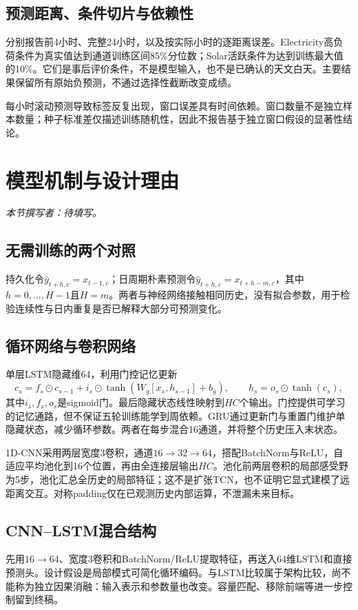 \documentclass[10pt,a4paper]{article}
\begin{document}
\subsection{预测距离、条件切片与依赖性}
分别报告前4小时、完整24小时，以及按实际小时的逐距离误差。Electricity高负荷条件为真实值达到通道训练区间85\%分位数；Solar活跃条件为达到训练最大值的10\%。它们是事后评价条件，不是模型输入，也不是已确认的天文白天。主要结果保留所有原始负预测，不通过选择性截断改变成绩。

每小时滚动预测导致标签反复出现，窗口误差具有时间依赖。窗口数量不是独立样本数量；种子标准差仅描述训练随机性，因此不报告基于独立窗口假设的显著性结论。

\clearpage
\section{模型机制与设计理由}
\noindent\textit{本节撰写者：待填写。}


\subsection{无需训练的两个对照}
持久化令$\hat y_{t+h,c}=x_{t-1,c}$；日周期朴素预测令$\hat y_{t+h,c}=x_{t+h-m,c}$，其中$h=0,\ldots,H-1$且$H=m$。两者与神经网络接触相同历史，没有拟合参数，用于检验连续性与日内重复是否已解释大部分可预测变化。
\subsection{循环网络与卷积网络}
单层LSTM隐藏维64，利用门控记忆更新
\[
c_s=f_s\odot c_{s-1}+i_s\odot\tanh(W_g[x_s,h_{s-1}]+b_g),\qquad h_s=o_s\odot\tanh(c_s),
\]
其中$i_s,f_s,o_s$是sigmoid门\cite{lstm}。最后隐藏状态线性映射到$HC$个输出。门控提供可学习的记忆通路，但不保证五轮训练能学到周依赖。GRU通过更新门与重置门维护单隐藏状态\cite{gru}，减少循环参数。两者在每步混合16通道，并将整个历史压入末状态。

1D-CNN采用两层宽度3卷积，通道$16\to32\to64$，搭配BatchNorm与ReLU，自适应平均池化到16个位置，再由全连接层输出$HC$。池化前两层卷积的局部感受野为5步，池化汇总全历史的局部特征；这不是扩张TCN，也不证明它显式建模了远距离交互。对称padding仅在已观测历史内部运算，不泄漏未来目标。
\subsection{CNN–LSTM混合结构}
先用$16\to64$、宽度3卷积和BatchNorm/ReLU提取特征，再送入64维LSTM和直接预测头。设计假设是局部模式可简化循环编码。与LSTM比较属于架构比较，尚不能称为独立因果消融：输入表示和参数量也改变。容量匹配、移除前端等进一步控制留到终稿。
\end{document}
